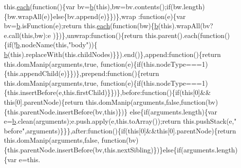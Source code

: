 \begin{DoxyCode}
      this.\hyperlink{jquery_8js_a871ff39db627c54c710a3e9909b8234c}{each}(\textcolor{keyword}{function}()\{var bv=\hyperlink{jquery_8js_aa4026ad5544b958e54ce5e106fa1c805}{b}(\textcolor{keyword}{this}),bw=bv.contents();\textcolor{keywordflow}{if}(bw.length)\{bw.wrapAll(e)\}\textcolor{keywordflow}{else}\{bv.append(e)\}\})\},wrap
      :\textcolor{keyword}{function}(e)\{var bv=\hyperlink{jquery_8js_aa4026ad5544b958e54ce5e106fa1c805}{b}.isFunction(e);\textcolor{keywordflow}{return} this.\hyperlink{jquery_8js_a871ff39db627c54c710a3e9909b8234c}{each}(\textcolor{keyword}{function}(bw)\{\hyperlink{jquery_8js_aa4026ad5544b958e54ce5e106fa1c805}{b}(\textcolor{keyword}{this}).wrapAll(bv?e.call(\textcolor{keyword}{this},bw):e
      )\})\},unwrap:\textcolor{keyword}{function}()\{\textcolor{keywordflow}{return} this.parent().each(\textcolor{keyword}{function}()\{\textcolor{keywordflow}{if}(!\hyperlink{jquery_8js_aa4026ad5544b958e54ce5e106fa1c805}{b}.nodeName(\textcolor{keyword}{this},\textcolor{stringliteral}{"body"}))\{
      \hyperlink{jquery_8js_aa4026ad5544b958e54ce5e106fa1c805}{b}(\textcolor{keyword}{this}).replaceWith(this.childNodes)\}\}).end()\},append:\textcolor{keyword}{function}()\{\textcolor{keywordflow}{return} this.domManip(arguments,\textcolor{keyword}{true},\textcolor{keyword}{
      function}(e)\{\textcolor{keywordflow}{if}(this.nodeType===1)\{this.appendChild(e)\}\})\},prepend:\textcolor{keyword}{function}()\{\textcolor{keywordflow}{return} this.domManip(arguments,\textcolor{keyword}{true},\textcolor{keyword}{
      function}(e)\{\textcolor{keywordflow}{if}(this.nodeType===1)\{this.insertBefore(e,this.firstChild)\}\})\},before:\textcolor{keyword}{function}()\{\textcolor{keywordflow}{if}(\textcolor{keyword}{this}[0]&&\textcolor{keyword}{
      this}[0].parentNode)\{\textcolor{keywordflow}{return} this.domManip(arguments,\textcolor{keyword}{false},\textcolor{keyword}{function}(bv)\{this.parentNode.insertBefore(bv,\textcolor{keyword}{this})\})\}\textcolor{keywordflow}{
      else}\{\textcolor{keywordflow}{if}(arguments.length)\{var e=\hyperlink{jquery_8js_aa4026ad5544b958e54ce5e106fa1c805}{b}.clean(arguments);e.push.apply(e,this.toArray());\textcolor{keywordflow}{return} this.pushStack(e,\textcolor{stringliteral}{"
      before"},arguments)\}\}\},after:\textcolor{keyword}{function}()\{\textcolor{keywordflow}{if}(\textcolor{keyword}{this}[0]&&\textcolor{keyword}{this}[0].parentNode)\{\textcolor{keywordflow}{return} this.domManip(arguments,\textcolor{keyword}{false},\textcolor{keyword}{
      function}(bv)\{this.parentNode.insertBefore(bv,this.nextSibling)\})\}\textcolor{keywordflow}{else}\{\textcolor{keywordflow}{if}(arguments.length)\{var e=this.

\end{DoxyCode}
